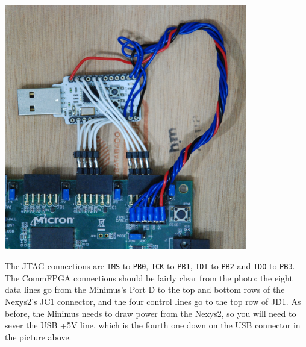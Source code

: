 \vspace*{0.5cm}
\centerline{\includegraphics[width=300pt]{images/nexys2}}

The JTAG connections are \texttt{TMS} to \texttt{PB0}, \texttt{TCK} to \texttt{PB1}, \texttt{TDI} to \texttt{PB2} and \texttt{TDO} to \texttt{PB3}. The CommFPGA connections should be fairly clear from the photo: the eight data lines go from the Minimus's Port D to the top and bottom rows of the Nexys2's JC1 connector, and the four control lines go to the top row of JD1. As before, the Minimus needs to draw power from the Nexys2, so you will need to sever the USB +5V line, which is the fourth one down on the USB connector in the picture above.


